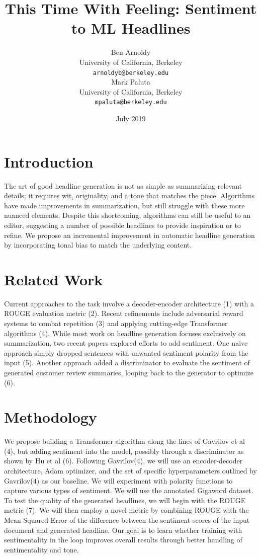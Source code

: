 \documentclass[11pt]{article}
\title{This Time With Feeling: Sentiment to ML Headlines}
\author{Ben Arnoldy \\
  University of California, Berkeley \\
  {\tt arnoldyb@berkeley.edu} \\\And
  Mark Paluta \\
  University of California, Berkeley \\
  {\tt mpaluta@berkeley.edu} \\}
\date{July 2019}
\begin{document}
\maketitle

\begin{abstract}
    
\end{abstract}

\section{Introduction}
The art of good headline generation is not as simple as summarizing relevant details; it requires wit, originality, and a tone that matches the piece. Algorithms have made improvements in summarization, but still struggle with these more nuanced elements. Despite this shortcoming, algorithms can still be useful to an editor, suggesting a number of possible headlines to provide inspiration or to refine. We propose an incremental improvement in automatic headline generation by incorporating tonal bias to match the underlying content.
\section{Related Work}
Current approaches to the task involve a decoder-encoder architecture (1) with a ROUGE evaluation metric (2). Recent refinements include adversarial reward systems to combat repetition (3) and applying cutting-edge Transformer algorithms (4).
While most work on headline generation focuses exclusively on summarization, two recent papers explored efforts to add sentiment. One naive approach simply dropped sentences with unwanted sentiment polarity from the input (5). Another approach added a discriminator to evaluate the sentiment of generated customer review summaries, looping back to the generator to optimize (6). 
\section{Methodology}
We propose building a Transformer algorithm along the lines of Gavrilov et al (4), but adding sentiment into the model, possibly through a discriminator as shown by Hu et al (6). Following Gavrilov(4), we will use an encoder-decoder architecture, Adam optimizer, and the set of specific hyperparameters outlined by Gavrilov(4) as our baseline. We will experiment with polarity functions to capture various types of sentiment. We will use the annotated Gigaword dataset. 
	To test the quality of the generated headlines, we will begin with the ROUGE metric (7). We will then employ a novel metric by combining ROUGE with the Mean Squared Error of the difference between the sentiment scores of the input document and generated headline. Our goal is to learn whether training with sentimentality in the loop improves overall results through better handling of sentimentality and tone.
\end{document}
